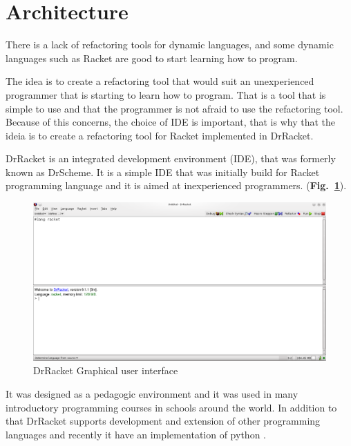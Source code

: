 
% 
% 


\section{Architecture}

There is a lack of refactoring tools for dynamic languages, and some dynamic languages such as Racket are good to start learning how to program.

The idea is to create a refactoring tool that would suit an unexperienced programmer that is starting to learn how to program. 
That is a tool that is simple to use and that the programmer is not afraid to use the refactoring tool.
Because of this concerns, the choice of IDE is important, that is why that the ideia is to create a refactoring tool for Racket implemented in DrRacket.

DrRacket is an integrated development environment (IDE), that was formerly known as DrScheme. It is a simple IDE that was initially build for Racket programming language and it is aimed at inexperienced programmers. ({\bf Fig.~\ref{fig:DrRacketGui}}).
\begin{figure}[tbhp]
	\centering
	\includegraphics[width=1\textwidth]{img/DrRacketGui.png}
	\caption{DrRacket Graphical user interface}
	\label{fig:DrRacketGui}
\end{figure}
It was designed as a pedagogic environment \cite{drscheme_pegadogy} and it was used in many introductory programming courses in schools around the world. In addition to that DrRacket supports development and extension of other programming languages \cite{tobin2011languages} and recently it have an implementation of python \cite{ramos2014implementation}.


